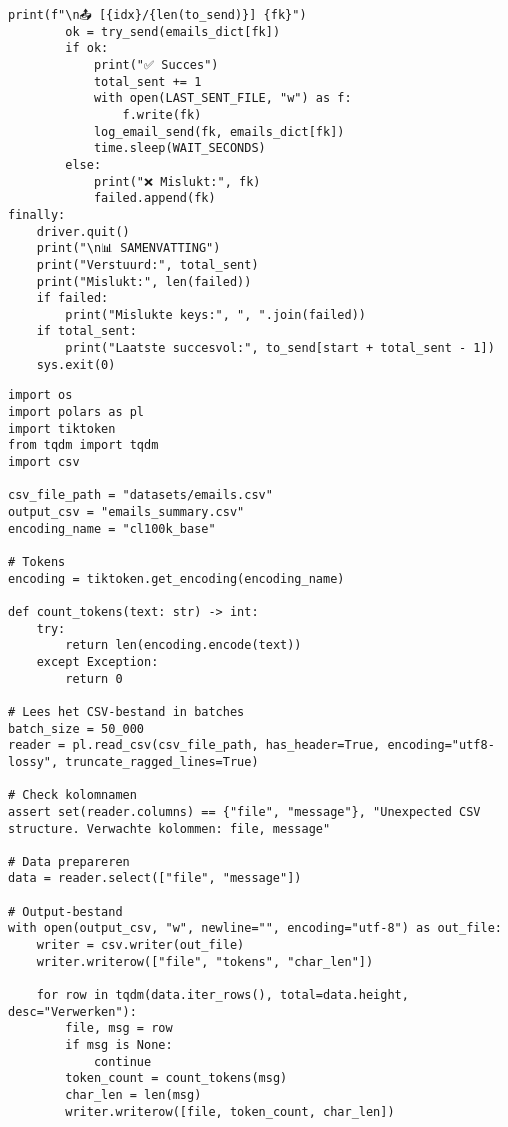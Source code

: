 \begin{lstlisting}[style=custompython,caption={Selenium WebDriver script voor automatisering van gegevensverwerking variabelen},label={lst:send-request}, captionpos=b]
        print(f"\n📤 [{idx}/{len(to_send)}] {fk}")
        ok = try_send(emails_dict[fk])
        if ok:
            print("✅ Succes")
            total_sent += 1
            with open(LAST_SENT_FILE, "w") as f:
                f.write(fk)
            log_email_send(fk, emails_dict[fk])
            time.sleep(WAIT_SECONDS)
        else:
            print("❌ Mislukt:", fk)
            failed.append(fk)
finally:
    driver.quit()
    print("\n📊 SAMENVATTING")
    print("Verstuurd:", total_sent)
    print("Mislukt:", len(failed))
    if failed:
        print("Mislukte keys:", ", ".join(failed))
    if total_sent:
        print("Laatste succesvol:", to_send[start + total_sent - 1])
    sys.exit(0)
\end{lstlisting}

\begin{lstlisting}[style=custompython,caption={Python-script voor het categoriseren en samenvatten van emails in een CSV-bestand},label={lst:email-summary}, captionpos=b]
import os
import polars as pl
import tiktoken
from tqdm import tqdm
import csv

csv_file_path = "datasets/emails.csv"
output_csv = "emails_summary.csv"
encoding_name = "cl100k_base"

# Tokens
encoding = tiktoken.get_encoding(encoding_name)

def count_tokens(text: str) -> int:
    try:
        return len(encoding.encode(text))
    except Exception:
        return 0

# Lees het CSV-bestand in batches
batch_size = 50_000
reader = pl.read_csv(csv_file_path, has_header=True, encoding="utf8-lossy", truncate_ragged_lines=True)

# Check kolomnamen
assert set(reader.columns) == {"file", "message"}, "Unexpected CSV structure. Verwachte kolommen: file, message"

# Data prepareren
data = reader.select(["file", "message"])

# Output-bestand
with open(output_csv, "w", newline="", encoding="utf-8") as out_file:
    writer = csv.writer(out_file)
    writer.writerow(["file", "tokens", "char_len"])

    for row in tqdm(data.iter_rows(), total=data.height, desc="Verwerken"):
        file, msg = row
        if msg is None:
            continue
        token_count = count_tokens(msg)
        char_len = len(msg)
        writer.writerow([file, token_count, char_len])
\end{lstlisting}

